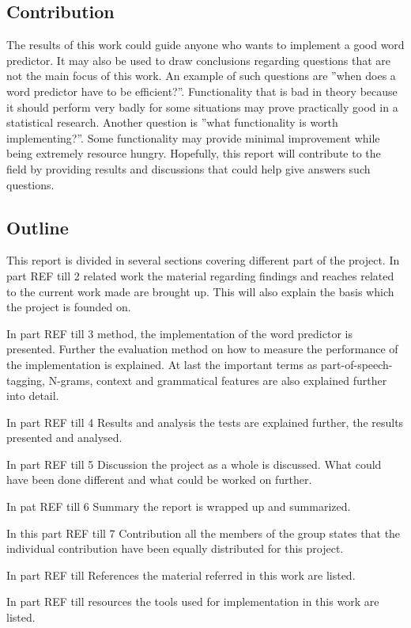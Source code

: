 \subsection{Contribution}
The results of this work could guide anyone who wants to implement a good word predictor. It may also be used to draw conclusions regarding questions that are not the main focus of this work. An example of such questions are ''when does a word predictor have to be efficient?''. Functionality that is bad in theory because it should perform very badly for some situations may prove practically good in a statistical research. Another question is ''what functionality is worth implementing?''. Some functionality may provide minimal improvement while being extremely resource hungry. Hopefully, this report will contribute to the field by providing results and discussions that could help give answers such questions.

\subsection{Outline}

This report is divided in several sections covering different part of the project. 
In part {REF till 2 related work} the material regarding findings and reaches  related to the current work made are brought up. This will also explain the basis which the project is founded on.   

In part {REF till 3 method}, the implementation of the word predictor is presented. Further the evaluation method  on how to measure the performance  of the implementation is explained. At last the important terms as part-of-speech-tagging, N-grams, context and grammatical features are also explained further into detail. 

In part {REF till 4 Results and analysis} the tests are explained further, the results presented and analysed.

In part {REF till 5 Discussion} the project as a whole is discussed. What could have been done different and what could be worked on further.

In pat {REF till 6 Summary} the report is wrapped up and summarized.

In this part {REF till 7 Contribution} all the members of the group states that the individual contribution have been equally distributed for this project.

In part {REF till References} the material referred in this work are listed.

In part {REF till resources} the tools used for implementation in this work are listed. 
